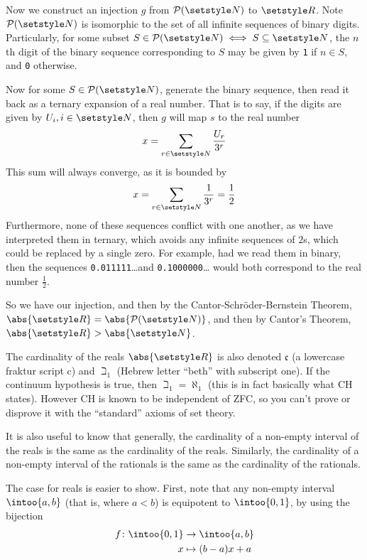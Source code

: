 Now we construct an injection \(g\) from \(\PowerSet(\Naturals)\) to \(\Reals\).
Note \(\PowerSet(\Naturals)\) is isomorphic to the set of all infinite sequences
of binary digits. Particularly, for some subset
\(S \in \PowerSet(\Naturals) \iff S \subseteq \Naturals\), the \(n\)th digit of
the binary sequence corresponding to \(S\) may be given by \texttt 1 if
\(n \in S\), and \texttt 0 otherwise.

Now for some \(S \in \PowerSet(\Naturals)\), generate the binary sequence, then
read it back as a ternary expansion of a real number. That is to say, if the
digits are given by \(U_i, i \in \Naturals\), then \(g\) will map \(s\) to the
real number
\begin{equation*}
 x = \sum_{r \in \Naturals} \frac{U_r}{3^r}
\end{equation*}
This sum will always converge, as it is bounded by
\begin{equation*}
 x = \sum_{r \in \Naturals} \frac 1{3^r} = \frac 12
\end{equation*}
Furthermore, none of these sequences conflict with one another, as we have
interpreted them in ternary, which avoids any infinite sequences of \(2\)s,
which could be replaced by a single zero. For example, had we read them in
binary, then the sequences \texttt{0.011111}\ldots and \texttt{0.1000000}\ldots
would both correspond to the real number \(\frac 12\).

So we have our injection, and then by the Cantor-Schr\"oder-Bernstein Theorem,
\(\abs{\Reals} = \abs{\PowerSet(\Naturals)}\), and then by Cantor's Theorem,
\(\abs{\Reals} > \abs{\Naturals}\).

The cardinality of the reals \(\abs{\Reals}\) is also denoted \(\mathfrak c\) (a
lowercase fraktur script c) and \(\beth_1\) (Hebrew letter ``beth'' with
subscript one). If the continuum hypothesis is true, then \(\beth_1 = \aleph_1\)
(this is in fact basically what CH states). However CH is known to be
independent of ZFC, so you can't prove or disprove it with the ``standard''
axioms of set theory.


It is also useful to know that generally, the cardinality of a non-empty
interval of the reals is the same as the cardinality of the reals. Similarly,
the cardinality of a non-empty interval of the rationals is the same as the
cardinality of the rationals.

The case for reals is easier to show. First, note that any non-empty interval
\(\intoo{a, b}\) (that is, where \(a < b\)) is equipotent to \(\intoo{0, 1}\),
by using the bijection
\begin{align*}
 f \colon \intoo{0, 1} &\to \intoo{a, b} \\
          x &\mapsto (b - a)x + a
\end{align*}

